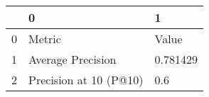\begin{tabular}{lll}
\toprule
{} &                       0 &         1 \\
\midrule
0 &                  Metric &     Value \\
1 &       Average Precision &  0.781429 \\
2 &  Precision at 10 (P@10) &       0.6 \\
\bottomrule
\end{tabular}
